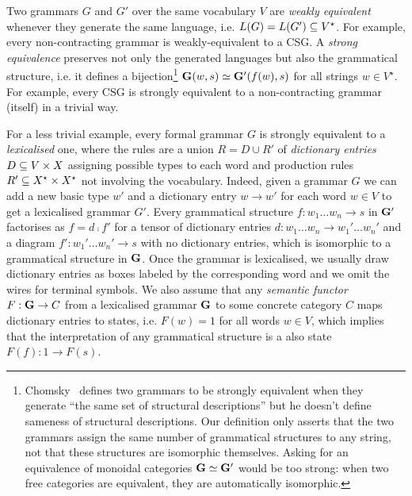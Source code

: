 Two grammars $G$ and $G'$ over the same vocabulary $V$ are \emph{weakly equivalent} whenever they generate the same language, i.e. $L(G) = L(G') \subseteq V^\star$.
For example, every non-contracting grammar is weakly-equivalent to a CSG.
A \emph{strong equivalence} preserves not only the generated languages but also the grammatical structure, i.e. it defines a bijection\footnote
{Chomsky~\cite{Chomsky63} defines two grammars to be strongly equivalent when they generate ``the same set of structural descriptions'' but he doesn't define sameness of structural descriptions.
Our definition only asserts that the two grammars assign the same number of grammatical structures to any string, not that these structures are isomorphic themselves.
Asking for an equivalence of monoidal categories $\mathbf{G} \simeq \mathbf{G}'$ would be too strong: when two free categories are equivalent, they are automatically isomorphic.} $\mathbf{G}(w, s) \simeq \mathbf{G}'(f(w), s)$ for all strings $w \in V^\star$.
For example, every CSG is strongly equivalent to a non-contracting grammar (itself) in a trivial way.

For a less trivial example, every formal grammar $G$ is strongly equivalent to a \emph{lexicalised} one, where the rules are a union $R = D \cup R'$ of \emph{dictionary entries} $D \subseteq V \times X$ assigning possible types to each word and production rules $R' \subseteq X^\star \times X^\star$ not involving the vocabulary.
Indeed, given a grammar $G$ we can add a new basic type $w'$ and a dictionary entry $w \to w'$ for each word $w \in V$ to get a lexicalised grammar $G'$.
Every grammatical structure $f : w_1 \dots w_n \to s$ in $\mathbf{G}'$ factorises as $f = d \fcmp f'$ for a tensor of dictionary entries $d : w_1 \dots w_n \to w_1' \dots w_n'$ and a diagram $f' : w_1' \dots w_n' \to s$ with no dictionary entries, which is isomorphic to a grammatical structure in $\mathbf{G}$.
Once the grammar is lexicalised, we usually draw dictionary entries as boxes labeled by the corresponding word and we omit the wires for terminal symbols.
We also assume that any \emph{semantic functor} $F : \mathbf{G} \to C$ from a lexicalised grammar $\mathbf{G}$ to some concrete category $C$ maps dictionary entries to states, i.e. $F(w) = 1$ for all words $w \in V$, which implies that the interpretation of any grammatical structure is a also state $F(f) : 1 \to F(s)$.

